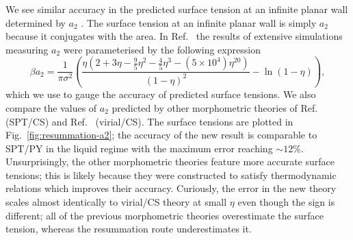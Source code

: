 \documentclass[11pt,twoside]{report}
\begin{document}
We see similar accuracy in the predicted surface tension at an infinite planar wall determined by $a_2$
.
The surface tension at an infinite planar wall is simply $a_2$ because it conjugates with the area.
In Ref.\ \cite{DavidchackMP2015} the results of extensive simulations measuring $a_2$ were parameterised by the following expression
\begin{equation}\label{eq:quasi-exact-surface-tension}
  \beta a_2
  =
  \frac{1}{\pi \sigma^2} \left(
  \frac{\eta (2 + 3\eta - \frac{9}{5}\eta^2 - \frac{4}{5}\eta^3 - (5 \times 10^4) \eta^{20})}{(1 - \eta)^2}
  - \ln{(1 - \eta)}
  \right),
\end{equation}
which we use to gauge the accuracy of predicted surface tensions.
We also compare the values of $a_2$ predicted by other morphometric theories of Ref.\ \cite{Hansen-GoosJPCM2006} (SPT/CS) and Ref.\ \cite{RobinsonPRE2019} (virial/CS).
The surface tensions are plotted in Fig.\ \ref{fig:resummation-a2}; the accuracy of the new result is comparable to SPT/PY in the liquid regime with the maximum error reaching $\sim12\%$.
Unsurprisingly, the other morphometric theories feature more accurate surface tensions; this is likely because they were constructed to satisfy thermodynamic relations which improves their accuracy.
Curiously, the error in the new theory scales almost identically to virial/CS theory at small $\eta$ even though the sign is different; all of the previous morphometric theories overestimate the surface tension, whereas the resummation route underestimates it.
\end{document}

